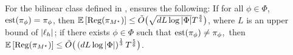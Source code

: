



\begin{theorem}\label{thm: bilinear result}
For the  bilinear class defined in ,  ensures the following: If for all $\phi \in \Phi$, $\operatorname*{est}(\pi_\phi) = \pi_\phi$, then $\mathbb{E}\left[\text{\rm Reg}(\pi_{M^\star})\right] \le \tilde{O}\big(\sqrt{dL\log|\Phi|}T^{\frac{3}{4}}\big)$,  where $L$ is an upper bound of $|\ell_h|$;
   if there exists $\phi \in \Phi$ such that \mbox{$\operatorname*{est}(\pi_\phi) \neq \pi_\phi$, then $\mathbb{E}\left[\text{\rm Reg}(\pi_{M^\star})\right]\le \tilde{O}\big(\left(dL\log|\Phi|\right)^{\frac{1}{3}}T^{\frac{5}{6}}\big)$. }%
\label{thm:mf-s}
\end{theorem}
\fi


